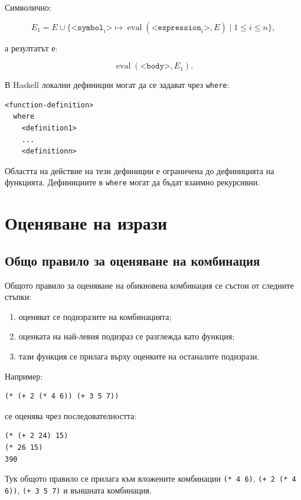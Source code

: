 Символично:

\[
E_1=E\cup
\{\texttt{<symbol}_i\texttt{>} \mapsto
\operatorname{eval}(\texttt{<expression}_i\texttt{>},E)
\mid 1\leq i\leq n\},
\]

а резултатът е:

\[
\operatorname{eval}(\texttt{<body>},E_1).
\]

В Haskell локални дефиниции могат да се задават чрез \texttt{where}:

\begin{verbatim}
<function-definition>
  where
    <definition1>
    ...
    <definitionn>
\end{verbatim}

Областта на действие на тези дефиниции е ограничена до дефиницията на функцията. Дефинициите в \texttt{where} могат да бъдат взаимно рекурсивни.

\section{Оценяване на изрази}\label{s:19.2}

\subsection{Общо правило за оценяване на комбинация}\label{s:19.2.1}

Общото правило за оценяване на обикновена комбинация се състои от следните стъпки:

\begin{enumerate}
    \item оценяват се подизразите на комбинацията;
    \item оценката на най-левия подизраз се разглежда като функция;
    \item тази функция се прилага върху оценките на останалите подизрази.
\end{enumerate}

Например:

\begin{verbatim}
(* (+ 2 (* 4 6)) (+ 3 5 7))
\end{verbatim}

се оценява чрез последователността:

\begin{verbatim}
(* (+ 2 24) 15)
(* 26 15)
390
\end{verbatim}

Тук общото правило се прилага към вложените комбинации \texttt{(* 4 6)}, \texttt{(+ 2 (* 4 6))}, \texttt{(+ 3 5 7)} и външната комбинация.

